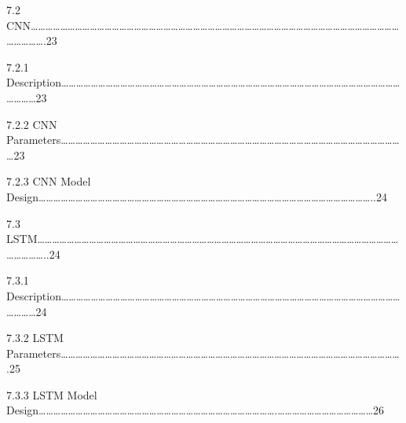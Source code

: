 \documentclass[a4paper,12pt]{article}
\begin{document}
7.2
CNN\ldots\ldots\ldots\ldots\ldots\ldots\ldots\ldots\ldots\ldots\ldots\ldots\ldots\ldots\ldots\ldots\ldots\ldots\ldots\ldots\ldots\ldots\ldots\ldots\ldots\ldots\ldots\ldots\ldots\ldots\ldots\ldots\ldots\ldots\ldots\ldots\ldots\ldots\ldots\ldots\ldots\ldots\ldots\ldots\ldots\ldots\ldots\ldots\ldots\ldots\ldots\ldots\ldots\ldots\ldots.23

7.2.1
Description\ldots\ldots\ldots\ldots\ldots\ldots\ldots\ldots\ldots\ldots\ldots\ldots\ldots\ldots\ldots\ldots\ldots\ldots\ldots\ldots\ldots\ldots\ldots\ldots\ldots\ldots\ldots\ldots\ldots\ldots\ldots\ldots\ldots\ldots\ldots\ldots\ldots\ldots\ldots\ldots\ldots\ldots\ldots\ldots\ldots\ldots\ldots\ldots\ldots\ldots23

7.2.2 CNN
Parameters\ldots\ldots\ldots\ldots\ldots\ldots\ldots\ldots\ldots\ldots\ldots\ldots\ldots\ldots\ldots\ldots\ldots\ldots\ldots\ldots\ldots\ldots\ldots\ldots\ldots\ldots\ldots\ldots\ldots\ldots\ldots\ldots\ldots\ldots\ldots\ldots\ldots\ldots\ldots\ldots\ldots\ldots\ldots\ldots\ldots\ldots\ldots23

7.2.3 CNN Model
Design\ldots\ldots\ldots\ldots\ldots\ldots\ldots\ldots\ldots\ldots\ldots\ldots\ldots\ldots\ldots\ldots\ldots\ldots\ldots\ldots\ldots\ldots\ldots\ldots\ldots\ldots\ldots\ldots\ldots\ldots\ldots\ldots\ldots\ldots\ldots\ldots\ldots\ldots\ldots\ldots\ldots\ldots\ldots\ldots\ldots..24

7.3
LSTM\ldots\ldots\ldots\ldots\ldots\ldots\ldots\ldots\ldots\ldots\ldots\ldots\ldots\ldots\ldots\ldots\ldots\ldots\ldots\ldots\ldots\ldots\ldots\ldots\ldots\ldots\ldots\ldots\ldots\ldots\ldots\ldots\ldots\ldots\ldots\ldots\ldots\ldots\ldots\ldots\ldots\ldots\ldots\ldots\ldots\ldots\ldots\ldots\ldots\ldots\ldots\ldots\ldots\ldots..24

7.3.1
Description\ldots\ldots\ldots\ldots\ldots\ldots\ldots\ldots\ldots\ldots\ldots\ldots\ldots\ldots\ldots\ldots\ldots\ldots\ldots\ldots\ldots\ldots\ldots\ldots\ldots\ldots\ldots\ldots\ldots\ldots\ldots\ldots\ldots\ldots\ldots\ldots\ldots\ldots\ldots\ldots\ldots\ldots\ldots\ldots\ldots\ldots\ldots\ldots\ldots\ldots24

7.3.2 LSTM
Parameters\ldots\ldots\ldots\ldots\ldots\ldots\ldots\ldots\ldots\ldots\ldots\ldots\ldots\ldots\ldots\ldots\ldots\ldots\ldots\ldots\ldots\ldots\ldots\ldots\ldots\ldots\ldots\ldots\ldots\ldots\ldots\ldots\ldots\ldots\ldots\ldots\ldots\ldots\ldots\ldots\ldots\ldots\ldots\ldots\ldots\ldots.25

7.3.3 LSTM Model
Design\ldots\ldots\ldots\ldots\ldots\ldots\ldots\ldots\ldots\ldots\ldots\ldots\ldots\ldots\ldots\ldots\ldots\ldots\ldots\ldots\ldots\ldots\ldots\ldots\ldots\ldots\ldots\ldots\ldots\ldots\ldots\ldots.\ldots\ldots\ldots\ldots\ldots\ldots\ldots\ldots\ldots\ldots\ldots\ldots\ldots26
\end{document}
